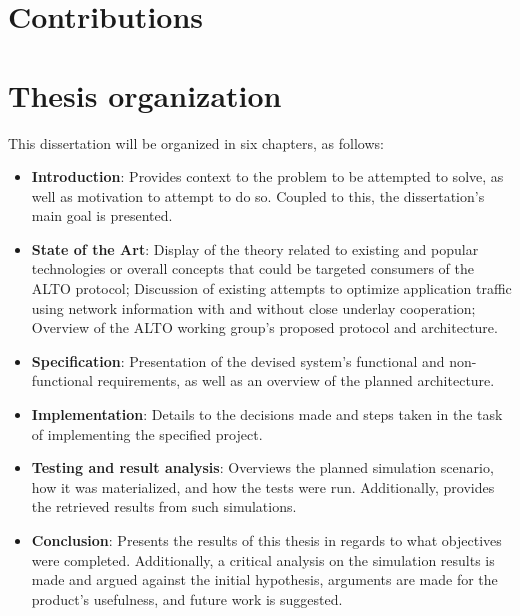 \section{Contributions}


\section{Thesis organization}

    This dissertation will be organized in six chapters, as follows:

\begin{itemize}
    \item \textbf{Introduction}: Provides context to the problem to be attempted to solve, as well as motivation to attempt to do so. Coupled to this, the dissertation's main goal is presented.
    \item \textbf{State of the Art}: Display of the theory related to existing and popular technologies or overall concepts that could be targeted consumers of the ALTO protocol; Discussion of existing attempts to optimize application traffic using network information with and without close underlay cooperation; Overview of the ALTO working group's proposed protocol and architecture.
    \item \textbf{Specification}: Presentation of the devised system's functional and non-functional requirements, as well as an overview of the planned architecture.
    \item \textbf{Implementation}: Details to the decisions made and steps taken in the task of implementing the specified project.
    \item \textbf{Testing and result analysis}: Overviews the planned simulation scenario, how it was materialized, and how the tests were run. Additionally, provides the retrieved results from such simulations.
    \item \textbf{Conclusion}: Presents the results of this thesis in regards to what objectives were completed. Additionally, a critical analysis on the simulation results is made and argued against the initial hypothesis, arguments are made for the product's usefulness, and future work is suggested.
\end{itemize}{}

